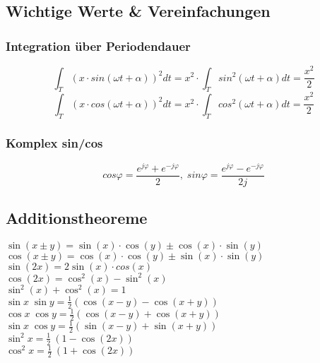 
\subsection{Wichtige Werte \& Vereinfachungen}

\subsubsection*{Integration über Periodendauer}
$$\int_T (x \cdot sin(\omega t + \alpha))^2 dt = x^2 \cdot \int_T sin^2(\omega t +\alpha) dt = \frac{x^2}{2}$$
$$\int_T (x \cdot cos(\omega t+\alpha))^2 dt = x^2 \cdot \int_T cos^2(\omega t+\alpha) dt = \frac{x^2}{2}$$


\subsubsection*{Komplex sin/cos}

$$cos \varphi = \frac{e^{j\varphi}+ e^{-j\varphi}}{2}, \; sin \varphi = \frac{e^{j\varphi} - e^{-j\varphi}}{2j} $$

\subsection*{Additionstheoreme}
\begin{multicols}{2}%
$\sin(x\pm y) = \sin(x) \cdot \cos(y) \pm \cos(x) \cdot \sin(y)$
\\$\cos(x \pm y)= \cos(x) \cdot \cos(y) \pm \sin(x) \cdot \sin(y)$
\\$\sin(2x) = 2 \sin(x) \cdot cos(x)$
\\$\cos(2x) = \cos^2(x)-\sin^2(x)$
\\$\sin^2(x) + \cos^2(x) = 1 $
\\$\sin x \; \sin y = \frac{1}{2}(\cos (x-y) - \cos (x+y))$
\\$\cos x \; \cos y = \frac{1}{2}(\cos (x-y) + \cos (x+y))$
\\$\sin x \; \cos y = \frac{1}{2}(\sin (x-y) + \sin (x+y))$
\\$\sin^2 x = \frac{1}{2}\ (1 - \cos (2x)) $
\\$\cos^2 x = \frac{1}{2}\ (1 + \cos (2x)) $
\end{multicols}